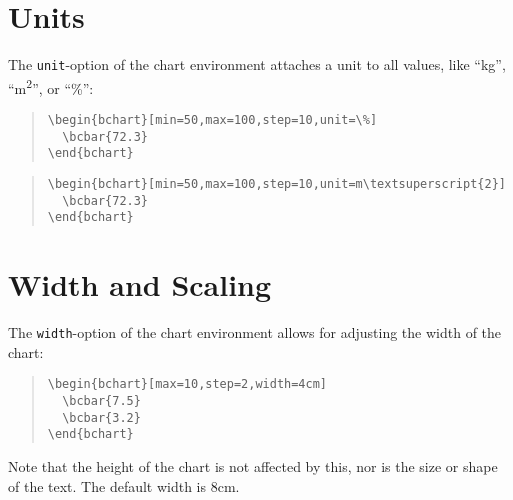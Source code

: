 \documentclass{article}
\begin{document}
\section{Units}

The \texttt{unit}-option of the chart environment attaches a unit to all values, like ``kg'', ``m\textsuperscript{2}'', or ``\%'':
\begin{quote}\small
\begin{verbatim}
\begin{bchart}[min=50,max=100,step=10,unit=\%]
  \bcbar{72.3}
\end{bchart}
\end{verbatim}
\end{quote}
\begin{quote}
\begin{bchart}[min=50,max=100,step=10,unit=\%]
\end{bchart}
\end{quote}
\begin{quote}\small
\begin{verbatim}
\begin{bchart}[min=50,max=100,step=10,unit=m\textsuperscript{2}]
  \bcbar{72.3}
\end{bchart}
\end{verbatim}
\end{quote}
\begin{quote}
\begin{bchart}[min=50,max=100,step=10,unit=m\textsuperscript{2}]
\end{bchart}
\end{quote}


\section{Width and Scaling}

The \texttt{width}-option of the chart environment allows for adjusting the width of the chart:
\begin{quote}\small
\begin{verbatim}
\begin{bchart}[max=10,step=2,width=4cm]
  \bcbar{7.5}
  \bcbar{3.2}
\end{bchart}
\end{verbatim}
\end{quote}
\begin{quote}
\begin{bchart}[max=10,step=2,width=4cm]
\end{bchart}
\end{quote}
Note that the height of the chart is not affected by this, nor is the size or shape of the text. The default width is 8cm.
\end{document}
